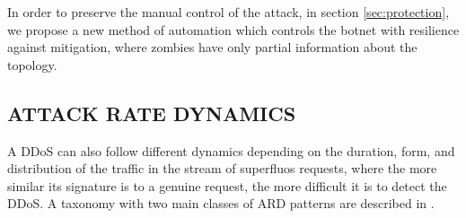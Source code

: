 \documentclass[a4paper,twoside]{article}
\begin{document}

In order to preserve the manual control of the attack, in section \ref{sec:protection}, we propose a new method of automation which controls the botnet with resilience against mitigation, where zombies have only partial information about the topology.

\subsection{\uppercase{Attack rate dynamics}} \label{sec:ard}

A DDoS can also follow different dynamics depending on the duration, form, and distribution of the traffic in the stream of superfluos requests, where the more similar its signature is to a genuine request, the more difficult it is to detect the DDoS. A taxonomy with two main classes of ARD patterns are described in \cite{Liu:2012}.


\end{document}
